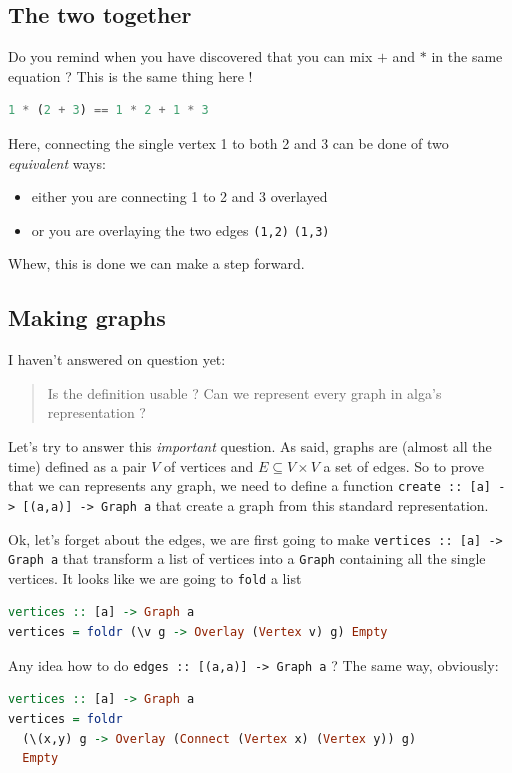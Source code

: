 \documentclass[10pt,a4paper]{article}
\begin{document}
\subsection{The two together}
Do you remind when you have discovered that you can mix $+$ and $*$ in the same equation ? This is the same thing here !
\begin{lstlisting}[language=Haskell, frame=single]
1 * (2 + 3) == 1 * 2 + 1 * 3
\end{lstlisting}
Here, connecting the single vertex 1 to both 2 and 3 can be done of two \emph{equivalent} ways: 
\begin{itemize}
	\item either you are connecting 1 to 2 and 3 overlayed
	\item or you are overlaying the two edges \verb|(1,2)| \verb|(1,3)|
\end{itemize}

Whew, this is done we can  make a step forward.

\subsection{Making graphs}
I haven't answered on question yet:
\begin{quote}
	Is the definition usable ? Can we represent every graph in alga's representation ?
\end{quote}

Let's try to answer this \emph{important} question. As said, graphs are (almost all the time) defined as a pair $V$ of vertices and $E \subseteq V \times V$ a set of edges. So to prove that we can represents any graph, we need to define a function \verb|create :: [a] -> [(a,a)] -> Graph a| that create a graph from this standard representation.

Ok, let's forget about the edges, we are first going to make \verb|vertices :: [a] -> Graph a| that transform a list of vertices into a \verb|Graph| containing all the single vertices. It looks like we are going to \verb|fold| a list

\begin{lstlisting}[language=Haskell, frame=single]
vertices :: [a] -> Graph a
vertices = foldr (\v g -> Overlay (Vertex v) g) Empty
\end{lstlisting}

Any idea how to do \verb|edges :: [(a,a)] -> Graph a| ? The same way, obviously:

\begin{lstlisting}[language=Haskell, frame=single]
vertices :: [a] -> Graph a
vertices = foldr 
  (\(x,y) g -> Overlay (Connect (Vertex x) (Vertex y)) g)
  Empty
\end{lstlisting}
\end{document}

